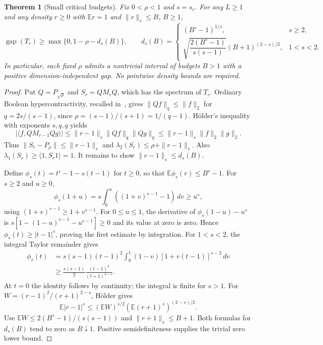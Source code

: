 \documentclass[11pt]{article}
\newtheorem{theorem}{Theorem}
\newcommand{\gap}{\operatorname{gap}}
\begin{document}
\begin{theorem}[Small critical budgets]\label{thm:critical-small}
Fix $0<\rho<1$ and $s=s_c$. For any $L\ge1$ and any density $r\ge0$
with $\mathbb E r=1$ and $\|r\|_s\le B$, $B\ge1$,
\[
 \gap(T_r)\ge\max\{0,1-\rho-d_s(B)\},\qquad
 d_s(B)=\begin{cases}
 (B^s-1)^{1/s},&s\ge2,\\
 \sqrt{\dfrac{2(B^s-1)}{s(s-1)}}(B+1)^{(2-s)/2},&1<s<2.
 \end{cases}
\]
In particular, each fixed $\rho$ admits a nontrivial interval of budgets
$B>1$ with a positive dimension-independent gap. No pointwise density
bounds are required.
\end{theorem}
\begin{proof}
Put $Q=P_{\sqrt\rho}$ and $S_r=QM_rQ$, which has the spectrum of $T_r$.
Ordinary Boolean hypercontractivity, recalled in~\cite[Eq.~(1.1)]{MOS},
gives $\|Qf\|_q\le\|f\|_2$ for $q=2s/(s-1)$, since
$\rho=(s-1)/(s+1)=1/(q-1)$. H\"older's inequality with exponents
$s,q,q$ yields
\[
 |\langle f,Q M_{r-1}Qg\rangle|
 \le\|r-1\|_s\|Qf\|_q\|Qg\|_q
 \le\|r-1\|_s\|f\|_2\|g\|_2.
\]
Thus $\|S_r-P_\rho\|\le\|r-1\|_s$ and
$\lambda_2(S_r)\le\rho+\|r-1\|_s$. Also
$\lambda_1(S_r)\ge\langle1,S_r1\rangle=1$.
It remains to show $\|r-1\|_s\le d_s(B)$.

Define $\phi_s(t)=t^s-1-s(t-1)$ for $t\ge0$, so that
$\mathbb E\phi_s(r)\le B^s-1$. For $s\ge2$ and $u\ge0$,
\[
 \phi_s(1+u)=s\int_0^u((1+v)^{s-1}-1)\,dv\ge u^s,
\]
using $(1+v)^{s-1}\ge1+v^{s-1}$. For $0\le u\le1$,
the derivative of $\phi_s(1-u)-u^s$ is
$s[1-(1-u)^{s-1}-u^{s-1}]\ge0$ and its value at zero is zero.
Hence $\phi_s(t)\ge|t-1|^s$, proving the first estimate by integration.
For $1<s<2$, the integral Taylor remainder gives
\begin{align*}
 \phi_s(t)&=s(s-1)(t-1)^2
  \int_0^1(1-v)[1+v(t-1)]^{s-2}\,dv\\
 &\ge\frac{s(s-1)}2\frac{(t-1)^2}{(t+1)^{2-s}}.
\end{align*}
At $t=0$ the identity follows by continuity; the integral is finite for
$s>1$. For $W=(r-1)^2/(r+1)^{2-s}$, H\"older gives
\[
 \mathbb E|r-1|^s
 \le(\mathbb EW)^{s/2}
       (\mathbb E(r+1)^s)^{(2-s)/2}.
\]
Use $\mathbb EW\le2(B^s-1)/(s(s-1))$ and $\|r+1\|_s\le B+1$.
Both formulas for $d_s(B)$ tend to zero as $B\downarrow1$.
Positive semidefiniteness supplies the trivial zero lower bound.
\end{proof}
\end{document}
